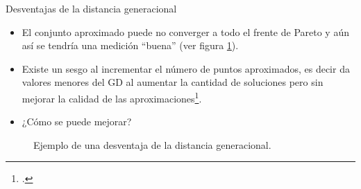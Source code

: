 \documentclass{beamer}
\begin{document}
\begin{frame}{Desventajas de la distancia generacional}
\begin{itemize}
\justifying
\scriptsize
\item El conjunto aproximado puede no converger a todo el frente de Pareto y aún así se tendría una medición ``buena'' (ver figura \ref{fig:igd}).

\item Existe un sesgo al incrementar el número de puntos aproximados, es decir da valores menores del GD al aumentar la cantidad de soluciones pero sin mejorar la calidad de las aproximaciones\footcite{Joel:HausdorffDistance}.
\item ¿Cómo se puede mejorar?
\end{itemize}
\begin{figure}[H]
\centering

\caption{\scriptsize Ejemplo de una desventaja de la distancia generacional.} \label{fig:igd}
\end{figure}


\end{frame}
\end{document}
